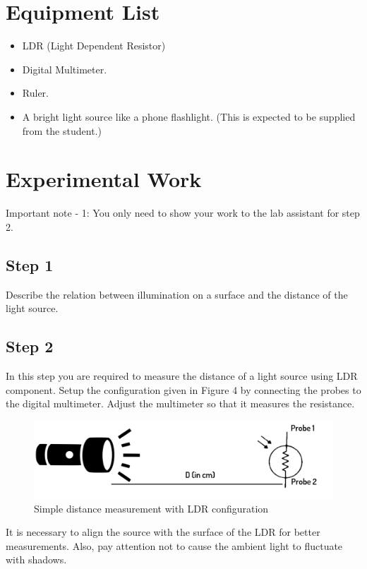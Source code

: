 \documentclass[letterpaper,12pt]{article}
\begin{document}
\section*{Equipment List}
\begin{itemize}
	\item LDR (Light Dependent Resistor)
	\item Digital Multimeter.
	\item Ruler.
	\item A bright light source like a phone flashlight. (This is expected to be supplied from the student.)
\end{itemize}
\section*{Experimental Work}
Important note - 1: You only need to show your work to the lab assistant for step 2.
\subsection*{Step 1}
Describe the relation between illumination on a surface and the distance of the light source.
\subsection*{Step 2}
In this step you are required to measure the distance of a light source using LDR component. Setup the configuration given in Figure 4 by connecting the probes to the digital multimeter. Adjust the multimeter so that it measures the resistance. 
\begin{figure}[H]
	\centering
	\includegraphics[width=1\textwidth]{setup.png}
	\caption{Simple distance measurement with LDR configuration}
\end{figure}
It is necessary to align the source with  the surface of the LDR for better measurements. Also, pay attention not to  cause the ambient light to fluctuate with shadows.
\end{document}
